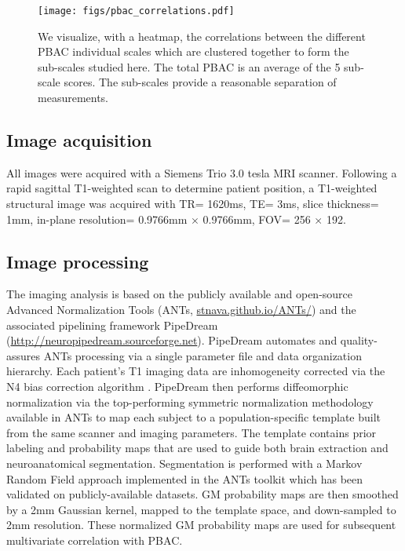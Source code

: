 \documentclass[preprint,authoryear,12pt]{elsarticle}
\begin{document}
\begin{figure}[th] \centering
\texttt{[image: figs/pbac\_correlations.pdf]}
\caption{We visualize, with a heatmap, the correlations between the different PBAC individual scales which are clustered together to form the sub-scales studied here.  The total PBAC is an average of the 5 sub-scale scores.  The sub-scales provide a reasonable separation of measurements.}
\label{fig:pbaccor}
\end{figure}

\subsection{Image acquisition}  All images were acquired with a Siemens Trio 3.0 tesla MRI scanner.  Following a rapid sagittal T1-weighted scan to determine patient position, a T1-weighted structural image was acquired with TR= 1620ms, TE= 3ms, slice thickness= 1mm, in-plane resolution= 0.9766mm $\times$  0.9766mm, FOV= 256 $\times$ 192. 

\subsection{Image processing} 

The imaging analysis is based on the publicly available and open-source Advanced Normalization Tools (ANTs, \url{stnava.github.io/ANTs/}) and the associated pipelining framework PipeDream (\url{http://neuropipedream.sourceforge.net}).  PipeDream automates and quality-assures ANTs processing via a single parameter file and data organization hierarchy.  Each patient's T1 imaging data are inhomogeneity corrected via the N4 bias correction algorithm \citet{Tustison2010}.  PipeDream then performs diffeomorphic normalization via the top-performing symmetric normalization methodology available in ANTs \citet{Avants2008,Avants2011a,wbir2012,Tustison2012} to map each subject to a population-specific template built from the same scanner and imaging parameters.  The template contains prior labeling and probability maps that are used to guide both brain extraction and neuroanatomical segmentation.  Segmentation is performed with a Markov Random Field approach \citet{Avants2011} implemented in the ANTs toolkit which has been validated on publicly-available datasets.  GM probability maps are then smoothed by a 2mm Gaussian kernel, mapped to the template space, and down-sampled to 2mm resolution.  These normalized GM probability maps are used for subsequent multivariate correlation with PBAC.
\end{document}
